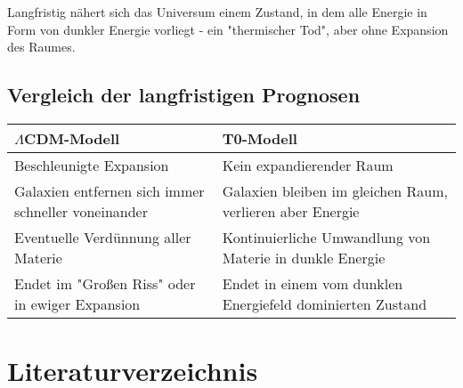 \documentclass[a4paper,12pt]{article}
\begin{document}
Langfristig nähert sich das Universum einem Zustand, in dem alle Energie in Form von dunkler Energie vorliegt - ein "thermischer Tod", aber ohne Expansion des Raumes.

\subsection{Vergleich der langfristigen Prognosen}

\begin{tcolorbox}[colback=yellow!5!white,colframe=yellow!75!black,title=Langfristige Entwicklung des Universums]
	\begin{tabular}{|p{}|p{}|}
		\hline
		\textbf{$\Lambda$CDM-Modell} & \textbf{T0-Modell} \\
		\hline
		Beschleunigte Expansion & Kein expandierender Raum \\
		\hline
		Galaxien entfernen sich immer schneller voneinander & Galaxien bleiben im gleichen Raum, verlieren aber Energie \\
		\hline
		Eventuelle Verdünnung aller Materie & Kontinuierliche Umwandlung von Materie in dunkle Energie \\
		\hline
		Endet im "Großen Riss" oder in ewiger Expansion & Endet in einem vom dunklen Energiefeld dominierten Zustand \\
		\hline
	\end{tabular}
\end{tcolorbox}

\section{Literaturverzeichnis}
\end{document}
